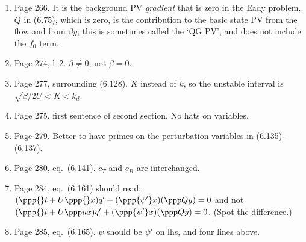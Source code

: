 \documentclass[10pt]{article}
\newcommand{\eq}{eq.\ } \newcommand{\Eq}{Eq.\ }
\begin{document}
\begin{enumerate}

\item Page 266. It is the background PV \emph{gradient} that is zero in the Eady problem. $Q$ in (6.75), which is zero, is the contribution to the basic state PV from the flow and from $\beta y$; this is sometimes called the `QG PV', and does not include the $f_0$ term. 




\item Page 274, l--2. $\beta \neq 0$, not $\beta = 0$. 

\item Page 277, surrounding (6.128). $K$ instead of $k$, so the unstable interval is $\sqrt{\beta/2U} < K < k_d$.

\item Page 275, first sentence of second section. No hats on variables.


\item Page 279. Better to have primes on the perturbation variables in (6.135)--(6.137). 

\item Page 280, \eq (6.141). $c_T$ and $c_B$ are interchanged.


\item Page 284, \eq (6.161) should read: $(\ppp{}t + U \ppp {}  x) q' + (\ppp{\psi'} x)( \ppp Q y) = 0 $ and not $(\ppp{}t + U \ppp u x) q' + (\ppp{\psi'}x) ( \ppp Q y )= 0 $. (Spot the difference.)

\item Page 285, \eq (6.165). $\psi$ should be $\psi'$ on lhs, and four lines above. 
 

\end{enumerate}
\end{document}

